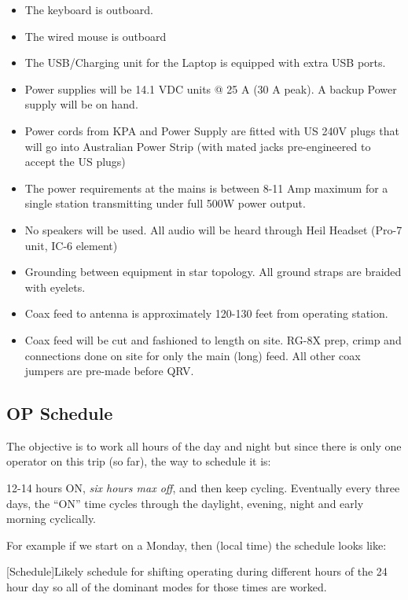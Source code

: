 \documentclass[11pt]{article}
\begin{document}
\begin{itemize}
\item The keyboard is outboard.
\item The wired mouse is outboard
\item The USB/Charging unit for the Laptop is equipped with extra USB ports.
\item Power supplies will be 14.1 VDC units @ 25 A (30 A peak).  A backup 
Power supply will be on hand. 
\item Power cords from KPA and Power Supply are fitted with US 240V plugs that 
will go into Australian Power Strip (with mated jacks pre-engineered to accept 
the US plugs)
\item The power requirements at the mains is between 8-11 Amp maximum for a 
single station transmitting under full 500W power output.
\item No speakers will be used.  All audio will be heard through Heil Headset 
(Pro-7 unit, IC-6 element)
\item Grounding between equipment in star topology.  All ground straps are 
braided with eyelets.
\item Coax feed to antenna is approximately 120-130 feet from operating 
station.
\item Coax feed will be cut and fashioned to length on site.  RG-8X prep, 
crimp and connections done on site for only the main (long) feed.  All other 
coax jumpers are pre-made before QRV.
\end{itemize}


\subsection{OP Schedule}

The objective is to work all hours of the day and night but since
there is only one operator on this trip (so far), the way to schedule it is:

\par
12-14 hours ON, {\textit{six hours max off}}, and then keep cycling.
Eventually every three days, the ``ON'' time cycles through the
daylight, evening, night and early morning cyclically.
\par
For example if we start on a Monday, then (local time) the schedule looks
like:

\vskip2mm
\noindent%
\begin{minipage}{\linewidth}%
\captionsetup{width=0.8\linewidth}
[Schedule]{Likely schedule for shifting operating during
different hours of the 24 hour day so all of the
dominant modes for those times are worked.}
\label{sked}
\end{minipage}
\vskip3mm
\end{document}
